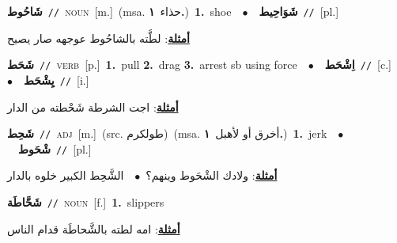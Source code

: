 \documentclass[10pt,a4paper,twoside]{article} %
\begin{document}
\begin{multicols}{2}
{\setlength\topsep{0pt}\textbf{\foreignlanguage{arabic}{شَاحُوط}}\ {\color{gray}\texttt{//}\color{black}}\ \textsc{noun}\ [m.]\ \color{gray}(msa. \foreignlanguage{arabic}{حذاء}~\foreignlanguage{arabic}{\textbf{١.}})\color{black}\ \textbf{1.}~shoe\ \ $\bullet$\ \ \setlength\topsep{0pt}\textbf{\foreignlanguage{arabic}{شَوَاحِيط}}\ {\color{gray}\texttt{//}\color{black}}\ [pl.]\  \begin{flushright}\color{gray}\foreignlanguage{arabic}{\textbf{\underline{\foreignlanguage{arabic}{أمثلة}}}: لطَّته بالشاحُوط عوجهه صار يصيح}\end{flushright}\color{black}} \vspace{2mm}

{\setlength\topsep{0pt}\textbf{\foreignlanguage{arabic}{شَحَط}}\ {\color{gray}\texttt{//}\color{black}}\ \textsc{verb}\ [p.]\ \textbf{1.}~pull  \textbf{2.}~drag  \textbf{3.}~arrest sb using force\ \ $\bullet$\ \ \setlength\topsep{0pt}\textbf{\foreignlanguage{arabic}{اِشْحَط}}\ {\color{gray}\texttt{//}\color{black}}\ [c.]\ \ $\bullet$\ \ \setlength\topsep{0pt}\textbf{\foreignlanguage{arabic}{يِشْحَط}}\ {\color{gray}\texttt{//}\color{black}}\ [i.]\  \begin{flushright}\color{gray}\foreignlanguage{arabic}{\textbf{\underline{\foreignlanguage{arabic}{أمثلة}}}: اجت الشرطة شَحْطته من الدار}\end{flushright}\color{black}} \vspace{2mm}

{\setlength\topsep{0pt}\textbf{\foreignlanguage{arabic}{شَحِط}}\ {\color{gray}\texttt{//}\color{black}}\ \textsc{adj}\ [m.]\ (src. \color{gray}\foreignlanguage{arabic}{طولكرم}\color{black})\ \color{gray}(msa. \foreignlanguage{arabic}{أخرق أو لأهبل}~\foreignlanguage{arabic}{\textbf{١.}})\color{black}\ \textbf{1.}~jerk\ \ $\bullet$\ \ \setlength\topsep{0pt}\textbf{\foreignlanguage{arabic}{شْحَوط}}\ {\color{gray}\texttt{//}\color{black}}\ [pl.]\  \begin{flushright}\color{gray}\foreignlanguage{arabic}{\textbf{\underline{\foreignlanguage{arabic}{أمثلة}}}: ولادك الشْحَوط وينهم؟\ $\bullet$\ \  الشَّحِط الكبير خلوه بالدار}\end{flushright}\color{black}} \vspace{2mm}

{\setlength\topsep{0pt}\textbf{\foreignlanguage{arabic}{شَحَّاطَة}}\ {\color{gray}\texttt{//}\color{black}}\ \textsc{noun}\ [f.]\ \textbf{1.}~slippers\  \begin{flushright}\color{gray}\foreignlanguage{arabic}{\textbf{\underline{\foreignlanguage{arabic}{أمثلة}}}: امه لطته بالشَّحاطَة قدام الناس}\end{flushright}\color{black}} \vspace{2mm}


\end{multicols}
\end{document}
